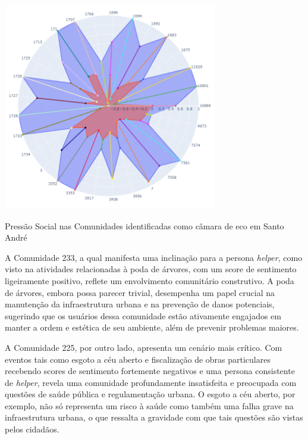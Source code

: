 \begin{quadro}[htb]
	\centering
	\includegraphics[width=0.7\textwidth]{images/echo_chambers_santo_andre_social_pressure.png}
	\caption{Pressão Social nas Comunidades identificadas como câmara de eco em Santo André}
	\label{fig:echo_chambers_santo_andre_social_pressure}
\end{quadro}

A Comunidade 233, a qual manifesta uma inclinação para a persona \textit{helper}, como visto na atividades relacionadas à poda de árvores, com um score de sentimento ligeiramente positivo, reflete um envolvimento comunitário construtivo. A poda de árvores, embora possa parecer trivial, desempenha um papel crucial na manutenção da infraestrutura urbana e na prevenção de danos potenciais, sugerindo que os usuários dessa comunidade estão ativamente engajados em manter a ordem e estética de seu ambiente, além de prevenir problemas maiores.

A Comunidade 225, por outro lado, apresenta um cenário mais crítico. Com eventos tais como esgoto a céu aberto e fiscalização de obras particulares recebendo scores de sentimento fortemente negativos e uma persona consistente de \textit{helper}, revela uma comunidade profundamente insatisfeita e preocupada com questões de saúde pública e regulamentação urbana. O esgoto a céu aberto, por exemplo, não só representa um risco à saúde como também uma falha grave na infraestrutura urbana, o que ressalta a gravidade com que tais questões são vistas pelos cidadãos.

